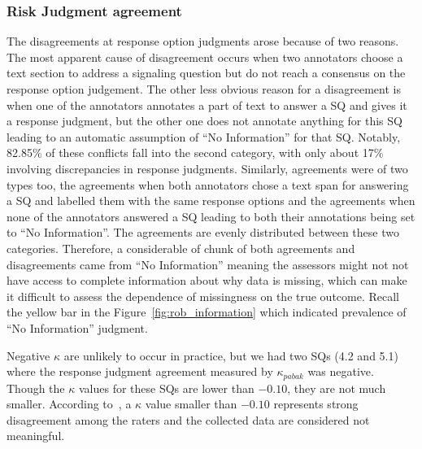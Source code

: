 \documentclass[sn-mathphys,Numbered]{sn-jnl}%
\theoremstyle{thmstyleone}%
\theoremstyle{thmstyletwo}%
\theoremstyle{thmstylethree}%
\begin{document}
\subsubsection{Risk Judgment agreement}
\label{disc:kappa}
%
The disagreements at response option judgments arose because of two reasons.
The most apparent cause of disagreement occurs when two annotators choose a text section to address a signaling question but do not reach a consensus on the response option judgement.
The other less obvious reason for a disagreement is when one of the annotators annotates a part of text to answer a SQ and gives it a response judgment, but the other one does not annotate anything for this SQ leading to an automatic assumption of ``No Information'' for that SQ.
Notably, 82.85\% of these conflicts fall into the second category, with only about 17\% involving discrepancies in response judgments.
Similarly, agreements were of two types too, the agreements when both annotators chose a text span for answering a SQ and labelled them with the same response options and the agreements when none of the annotators answered a SQ leading to both their annotations being set to ``No Information''.
The agreements are evenly distributed between these two categories.
Therefore, a considerable of chunk of both agreements and disagreements came from ``No Information'' meaning the assessors might not not have access to complete information about why data is missing, which can make it difficult to assess the dependence of missingness on the true outcome.
Recall the yellow bar in the Figure~\ref{fig:rob_information} which indicated prevalence of ``No Information'' judgment.


Negative $\kappa$ are unlikely to occur in practice, but we had two SQs (4.2 and 5.1) where the response judgment agreement measured by $\kappa_{pabak}$ was negative.
Though the $\kappa$ values for these SQs are lower than $-0.10$, they are not much smaller.
According to~\cite{mchugh2012interrater}, a $\kappa$ value smaller than $-0.10$ represents strong disagreement among the raters and the collected data are considered not meaningful.


\end{document}
